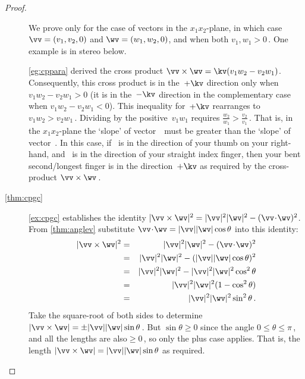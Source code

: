 \begin{proof}
\begin{description}
We prove only for the case of vectors in the \(x_1x_2\)-plane, in which case \(\vv=(v_1,v_2,0)\) and \(\wv=(w_1,w_2,0)\), and when both \(v_1,w_1>0\)\,.
One example is in stereo below.
\begin{center}
\end{center}
\cref{eg:cppara} derived the cross product \(\vv\times\wv=\kv(v_1w_2-v_2w_1)\).
Consequently, this cross product is in the~\(+\kv\) direction only when \(v_1w_2-v_2w_1>0\) (it is in the~\(-\kv\) direction in the complementary case when \(v_1w_2-v_2w_1<0\)). 
This inequality for~\(+\kv\) rearranges to \(v_1w_2>v_2w_1\)\,.
Dividing by the positive~\(v_1w_1\) requires \(\frac{w_2}{w_1}>\frac{v_2}{v_1}\)\,.
That is, in the \(x_1x_2\)-plane the `slope' of vector~\wv\ must be greater than the `slope' of vector~\vv.
In this case, if \vv~is in the direction of your thumb on your right-hand, and \wv~is in the direction of your straight index finger, then your bent second\slash longest finger is in the direction~\(+\kv\) as required by the cross-product \(\vv\times\wv\)\,.

\item[\ref{thm:cpgc}] \cref{ex:cpgc} establishes the identity \(|\vv\times\wv|^2=|\vv|^2|\wv|^2-(\vv\cdot\wv)^2\).
From \cref{thm:anglev} substitute \(\vv\cdot\wv=|\vv||\wv|\cos\theta\) into this identity:
\begin{eqnarray*}
|\vv\times\wv|^2&=&|\vv|^2|\wv|^2-(\vv\cdot\wv)^2
\\&=&|\vv|^2|\wv|^2-(|\vv||\wv|\cos\theta)^2
\\&=&|\vv|^2|\wv|^2-|\vv|^2|\wv|^2\cos^2\theta
\\&=&|\vv|^2|\wv|^2(1-\cos^2\theta)
\\&=&|\vv|^2|\wv|^2\sin^2\theta\,.
\end{eqnarray*}
Take the square-root of both sides to determine \(|\vv\times\wv|=\pm|\vv||\wv|\sin\theta\)\,.
But \(\sin\theta\geq0\) since the angle \(0\leq\theta\leq\pi\)\,, and all the lengths are also\({}\geq0\)\,, so only the plus case applies.
That is, the length \(|\vv\times\wv|=|\vv||\wv|\sin\theta\) as required.


\end{description}
\end{proof}
